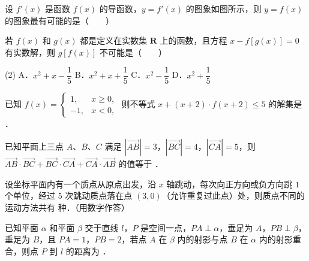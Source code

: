 \begin{question}
设 $f'(x)$ 是函数 $f(x)$ 的导函数，$y = f'(x)$ 的图象如图所示，则 $y = f(x)$ 的图象最有可能的是\mbox{（　　）}
\nopagebreak[4]
\begin{center}\end{center}
\nopagebreak[4]
\end{question}
\begin{question}
若 $f(x)$ 和 $g(x)$ 都是定义在实数集 $\mathbf{R}$ 上的函数，且方程 $x - f[g(x)] = 0$ 有实数解，则 $g[f(x)]$ 不可能是\mbox{（　　）}

\begin{gkopts}(2)
\task A．$x^2 + x - \dfrac{1}{5}$
\task B．$x^2 + x + \dfrac{1}{5}$
\task C．$x^2 - \dfrac{1}{5}$
\task D．$x^2 + \dfrac{1}{5}$
\end{gkopts}

\end{question}

\begin{question}
已知 $f(x) = \begin{cases} 1, & x \geqslant 0, \\ -1, & x < 0, \end{cases}$ 则不等式 $x + (x + 2) \cdot f(x + 2) \leqslant 5$ 的解集是 \underline{\hspace{3cm}}．

\end{question}
\begin{question}
已知平面上三点 $A$、$B$、$C$ 满足 $|\vec{AB}| = 3$，$|\vec{BC}| = 4$，$|\vec{CA}| = 5$，则 $\vec{AB} \cdot \vec{BC} + \vec{BC} \cdot \vec{CA} + \vec{CA} \cdot \vec{AB}$ 的值等于 \underline{\hspace{3cm}}．

\end{question}
\begin{question}
设坐标平面内有一个质点从原点出发，沿 $x$ 轴跳动，每次向正方向或负方向跳 $1$ 个单位，经过 $5$ 次跳动质点落在点 $(3, 0)$（允许重复过此点）处，则质点不同的运动方法共有 \underline{\hspace{3cm}} 种．（用数字作答）

\end{question}
\begin{question}
已知平面 $\alpha$ 和平面 $\beta$ 交于直线 $l$，$P$ 是空间一点，$PA \perp \alpha$，垂足为 $A$，$PB \perp \beta$，垂足为 $B$，且 $PA = 1$，$PB = 2$，若点 $A$ 在 $\beta$ 内的射影与点 $B$ 在 $\alpha$ 内的射影重合，则点 $P$ 到 $l$ 的距离为 \underline{\hspace{3cm}}．

\end{question}

